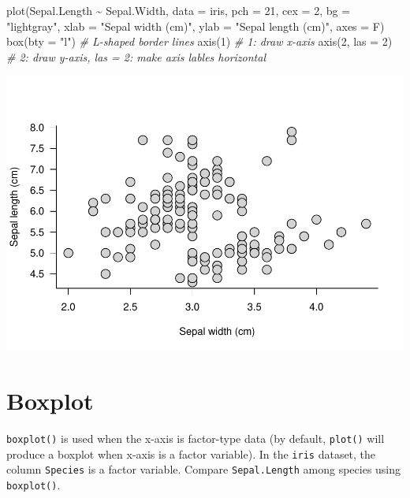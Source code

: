 \documentclass[
]{book}
\newenvironment{Shaded}{\begin{snugshade}}{\end{snugshade}}
\newcommand{\AttributeTok}[1]{\textcolor[rgb]{0.77,0.63,0.00}{#1}}
\newcommand{\CommentTok}[1]{\textcolor[rgb]{0.56,0.35,0.01}{\textit{#1}}}
\newcommand{\DecValTok}[1]{\textcolor[rgb]{0.00,0.00,0.81}{#1}}
\newcommand{\FunctionTok}[1]{\textcolor[rgb]{0.00,0.00,0.00}{#1}}
\newcommand{\NormalTok}[1]{#1}
\newcommand{\SpecialCharTok}[1]{\textcolor[rgb]{0.00,0.00,0.00}{#1}}
\newcommand{\StringTok}[1]{\textcolor[rgb]{0.31,0.60,0.02}{#1}}
\begin{document}
\begin{Shaded}
\begin{Highlighting}[]
\FunctionTok{plot}\NormalTok{(Sepal.Length }\SpecialCharTok{\textasciitilde{}}\NormalTok{ Sepal.Width, }\AttributeTok{data =}\NormalTok{ iris,}
     \AttributeTok{pch =} \DecValTok{21}\NormalTok{, }\AttributeTok{cex =} \DecValTok{2}\NormalTok{, }\AttributeTok{bg =} \StringTok{"lightgray"}\NormalTok{,}
     \AttributeTok{xlab =} \StringTok{"Sepal width (cm)"}\NormalTok{, }\AttributeTok{ylab =} \StringTok{"Sepal length (cm)"}\NormalTok{,}
     \AttributeTok{axes =}\NormalTok{ F)}
\FunctionTok{box}\NormalTok{(}\AttributeTok{bty =} \StringTok{"l"}\NormalTok{) }\CommentTok{\# L{-}shaped border lines}
\FunctionTok{axis}\NormalTok{(}\DecValTok{1}\NormalTok{) }\CommentTok{\# 1: draw x{-}axis}
\FunctionTok{axis}\NormalTok{(}\DecValTok{2}\NormalTok{, }\AttributeTok{las =} \DecValTok{2}\NormalTok{) }\CommentTok{\# 2: draw y{-}axis, las = 2: make axis lables horizontal}
\end{Highlighting}
\end{Shaded}

\begin{center}\includegraphics{_main_files/figure-latex/unnamed-chunk-122-1} \end{center}

\hypertarget{boxplot-1}{%
\section{Boxplot}\label{boxplot-1}}

\texttt{boxplot()} is used when the x-axis is factor-type data (by default, \texttt{plot()} will produce a boxplot when x-axis is a factor variable). In the \texttt{iris} dataset, the column \texttt{Species} is a factor variable. Compare \texttt{Sepal.Length} among species using \texttt{boxplot()}.
\end{document}
